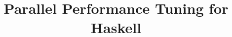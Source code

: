 \documentclass[twocolumn,9pt]{sigplanconf}
\title{Parallel Performance Tuning for Haskell}
\begin{document}
\maketitle

\begin{abstract}
\end{abstract}




\end{document}
